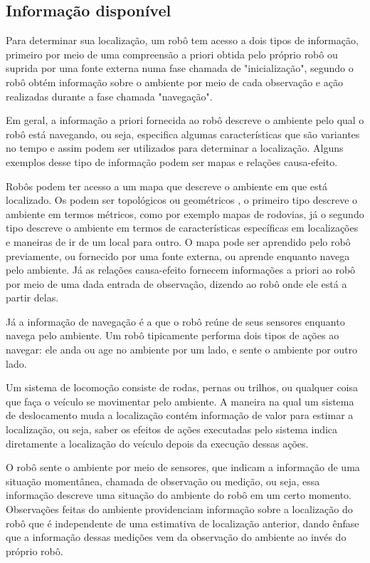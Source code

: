 \documentclass[acronym, symbols]{fei}
\begin{document}
		\subsection{Informação disponível}
			
			Para determinar sua localização, um robô tem acesso a dois tipos de informação, primeiro por meio de uma compreensão a priori obtida pelo próprio robô ou suprida por uma fonte externa numa fase chamada de "inicialização", segundo o robô obtém informação sobre o ambiente por meio de cada observação e ação realizadas durante a fase chamada "navegação". 
			
			Em geral, a informação a priori fornecida ao robô descreve o ambiente pelo qual o robô está navegando, ou seja, especifica algumas características que são variantes no tempo e assim podem ser utilizados para determinar a localização. Alguns exemplos desse tipo de informação podem ser mapas e relações causa-efeito.
			
			Robôs podem ter acesso a um mapa que descreve o ambiente em que está localizado. Os podem ser topológicos ou geométricos \cite{singhal1997issues}, o primeiro tipo descreve o ambiente em termos métricos, como por exemplo mapas de rodovias, já o segundo tipo descreve o ambiente em termos de características específicas em localizações e maneiras de ir de um local para outro. O mapa pode ser aprendido pelo robô previamente, ou fornecido por uma fonte externa, ou aprende enquanto navega pelo ambiente. Já as relações causa-efeito fornecem informações a priori ao robô por meio de uma dada entrada de observação, dizendo ao robô onde ele está a partir delas. 
			
			Já a informação de navegação é a que o robô reúne de seus sensores enquanto navega pelo ambiente. Um robô tipicamente performa dois tipos de ações ao navegar: ele anda ou age no ambiente por um lado, e sente o ambiente por outro lado.
			
			Um sistema de locomoção consiste de rodas, pernas ou trilhos, ou qualquer coisa que faça o veículo se movimentar pelo ambiente. A maneira na qual um sistema de deslocamento muda a localização contém informação de valor para estimar a localização, ou seja, saber os efeitos de ações executadas pelo sistema indica diretamente a localização do veículo depois da execução dessas ações.
			
			O robô sente o ambiente por meio de sensores, que indicam a informação de uma situação momentânea, chamada de observação ou medição, ou seja, essa informação descreve uma situação do ambiente do robô em um certo momento. Observações feitas do ambiente providenciam informação sobre a localização do robô que é independente de uma estimativa de localização anterior, dando ênfase que a informação dessas medições vem da observação do ambiente ao invés do próprio robô.
	
\end{document}
